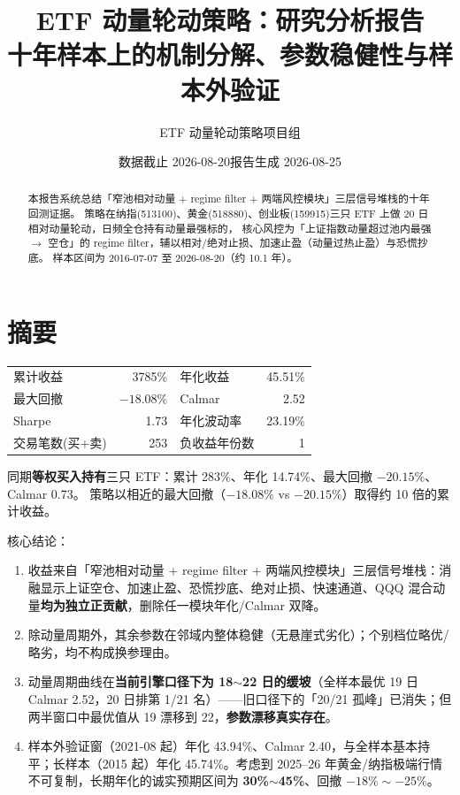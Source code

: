 \documentclass[11pt]{ctexart}
\title{\bfseries ETF 动量轮动策略：研究分析报告\\[0.4em]
\large 十年样本上的机制分解、参数稳健性与样本外验证}
\author{\normalsize ETF 动量轮动策略项目组}
\date{\normalsize 数据截止 2026-08-20\quad 报告生成 2026-08-25}
\newcommand{\pos}[1]{\textcolor{poscol}{#1}}   %
\newcommand{\red}[1]{\textcolor{accent}{#1}}   %
\begin{document}
\maketitle
\thispagestyle{fancy}

\begin{abstract}
\noindent 本报告系统总结「窄池相对动量 + regime filter + 两端风控模块」三层信号堆栈的十年回测证据。
策略在纳指(513100)、黄金(518880)、创业板(159915)三只 ETF 上做 20 日相对动量轮动，日频全仓持有动量最强标的，
核心风控为「上证指数动量超过池内最强 $\rightarrow$ 空仓」的 regime filter，辅以相对/绝对止损、加速止盈（动量过热止盈）与恐慌抄底。
样本区间为 2016-07-07 至 2026-08-20（约 10.1 年）。
\end{abstract}

\tableofcontents
\clearpage

\section{摘要}

\begin{center}
\begin{tabular}{lrlr}
\toprule
累计收益 & \pos{3785\%} & 年化收益 & 45.51\% \\
最大回撤 & \red{$-18.08\%$} & Calmar & 2.52 \\
Sharpe & 1.73 & 年化波动率 & 23.19\% \\
交易笔数(买+卖) & 253 & 负收益年份数 & 1 \\
\bottomrule
\end{tabular}
\end{center}

同期\textbf{等权买入持有}三只 ETF：累计 283\%、年化 14.74\%、最大回撤 \red{$-20.15\%$}、Calmar 0.73。
策略以相近的最大回撤（$-18.08\%$ vs $-20.15\%$）取得约 10 倍的累计收益。

核心结论：
\begin{enumerate}
  \item 收益来自「窄池相对动量 + regime filter + 两端风控模块」三层信号堆栈：消融显示上证空仓、加速止盈、恐慌抄底、绝对止损、快速通道、QQQ 混合动量\textbf{均为独立正贡献}，删除任一模块年化/Calmar 双降。
  \item 除动量周期外，其余参数在邻域内整体稳健（无悬崖式劣化）；个别档位略优/略劣，均不构成换参理由。
  \item 动量周期曲线在\textbf{当前引擎口径下为 18$\sim$22 日的缓坡}（全样本最优 19 日 Calmar 2.52，20 日排第 1/21 名）——旧口径下的「20/21 孤峰」已消失；但两半窗口中最优值从 19 漂移到 22，\textbf{参数漂移真实存在}。
  \item 样本外验证窗（2021-08 起）年化 43.94\%、Calmar 2.40，与全样本基本持平；长样本（2015 起）年化 45.74\%。考虑到 2025--26 年黄金/纳指极端行情不可复制，长期年化的诚实预期区间为 \textbf{30\%$\sim$45\%}、回撤 $-18\%\sim-25\%$。
\end{enumerate}
\end{document}
